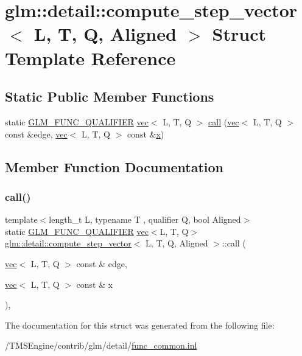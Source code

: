 \hypertarget{structglm_1_1detail_1_1compute__step__vector}{}\section{glm\+:\+:detail\+:\+:compute\+\_\+step\+\_\+vector$<$ L, T, Q, Aligned $>$ Struct Template Reference}
\label{structglm_1_1detail_1_1compute__step__vector}
\subsection*{Static Public Member Functions}
\begin{DoxyCompactItemize}
\item 
static \hyperlink{setup_8hpp_a33fdea6f91c5f834105f7415e2a64407}{G\+L\+M\+\_\+\+F\+U\+N\+C\+\_\+\+Q\+U\+A\+L\+I\+F\+I\+ER} \hyperlink{structglm_1_1vec}{vec}$<$ L, T, Q $>$ \hyperlink{structglm_1_1detail_1_1compute__step__vector_a495017a548067602a85fc3b9eb8563be}{call} (\hyperlink{structglm_1_1vec}{vec}$<$ L, T, Q $>$ const \&edge, \hyperlink{structglm_1_1vec}{vec}$<$ L, T, Q $>$ const \&\hyperlink{_s_d_l__opengl_8h_ad0e63d0edcdbd3d79554076bf309fd47}{x})
\end{DoxyCompactItemize}


\subsection{Member Function Documentation}
\mbox{\label{structglm_1_1detail_1_1compute__step__vector_a495017a548067602a85fc3b9eb8563be}} 
\subsubsection{\texorpdfstring{call()}{call()}}
{\footnotesize\ttfamily template$<$length\+\_\+t L, typename T , qualifier Q, bool Aligned$>$ \\
static \hyperlink{setup_8hpp_a33fdea6f91c5f834105f7415e2a64407}{G\+L\+M\+\_\+\+F\+U\+N\+C\+\_\+\+Q\+U\+A\+L\+I\+F\+I\+ER} \hyperlink{structglm_1_1vec}{vec}$<$L, T, Q$>$ \hyperlink{structglm_1_1detail_1_1compute__step__vector}{glm\+::detail\+::compute\+\_\+step\+\_\+vector}$<$ L, T, Q, Aligned $>$\+::call (\begin{DoxyParamCaption}\item[{\hyperlink{structglm_1_1vec}{vec}$<$ L, T, Q $>$ const \&}]{edge,  }\item[{\hyperlink{structglm_1_1vec}{vec}$<$ L, T, Q $>$ const \&}]{x }\end{DoxyParamCaption})\hspace{0.3cm}{\ttfamily [inline]}, {\ttfamily [static]}}



The documentation for this struct was generated from the following file\+:\begin{DoxyCompactItemize}
\item 
/\+T\+M\+S\+Engine/contrib/glm/detail/\hyperlink{func__common_8inl}{func\+\_\+common.\+inl}\end{DoxyCompactItemize}
